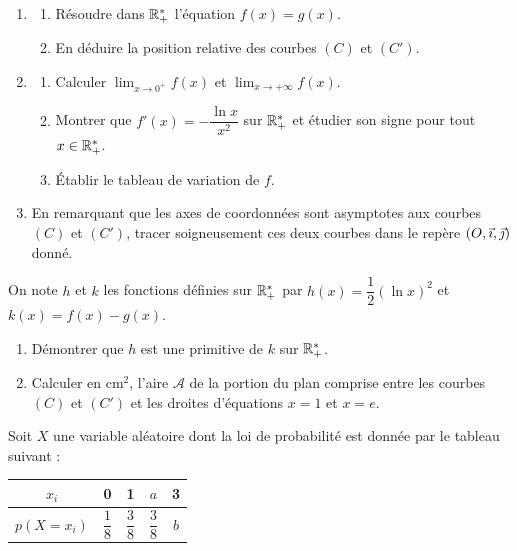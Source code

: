 \documentclass[11pt]{article}
\begin{document}
\begin{enumerate}
  \item \begin{enumerate}[label=\alph*.]
    \item Résoudre dans $\mathbb{R}_+^*$ l'équation $f(x) = g(x)$.
    \item En déduire la position relative des courbes $(C)$ et $(C')$.
  \end{enumerate}
  \item \begin{enumerate}[label=\alph*.]
    \item Calculer $\displaystyle\lim_{x\to 0^+} f(x)$ et $\displaystyle\lim_{x\to+\infty} f(x)$.
    \item Montrer que $f'(x) = -\dfrac{\ln x}{x^2}$ sur $\mathbb{R}_+^*$ et étudier son signe pour tout $x \in \mathbb{R}_+^*$.
    \item Établir le tableau de variation de $f$.
  \end{enumerate}
  \item En remarquant que les axes de coordonnées sont asymptotes aux courbes $(C)$ et $(C')$, tracer soigneusement ces deux courbes dans le repère $(O,\vec{\imath},\vec{\jmath})$ donné.
\end{enumerate}

On note $h$ et $k$ les fonctions définies sur $\mathbb{R}_+^*$ par $h(x) = \dfrac{1}{2}(\ln x)^2$ et $k(x) = f(x) - g(x)$.

\begin{enumerate}
  \item Démontrer que $h$ est une primitive de $k$ sur $\mathbb{R}_+^*$.
  \item Calculer en cm$^2$, l'aire $\mathcal{A}$ de la portion du plan comprise entre les courbes $(C)$ et $(C')$ et les droites d'équations $x = 1$ et $x = e$.
\end{enumerate}


Soit $X$ une variable aléatoire dont la loi de probabilité est donnée par le tableau suivant :

\begin{center}
\renewcommand{\arraystretch}{1.6}
\begin{tabular}{|c|c|c|c|c|}
\hline
$x_i$ & 0 & 1 & $a$ & 3 \\
\hline
$p(X = x_i)$ & $\dfrac{1}{8}$ & $\dfrac{3}{8}$ & $\dfrac{3}{8}$ & $b$ \\
\hline
\end{tabular}
\end{center}
\end{document}
